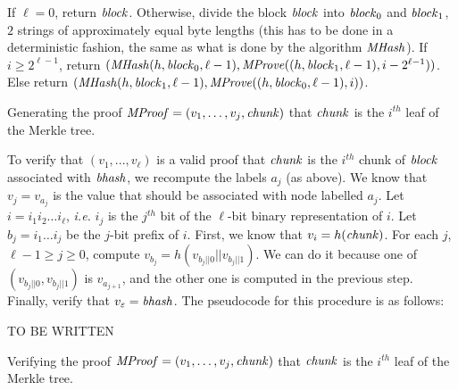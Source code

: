 \begin{algorithm}[H]\label{alg:merkleproof}
\dontprintsemicolon

\BlankLine


\Indp
  If $\ell=0$, return ${{\mathit{block}}}$. \;
  Otherwise, divide the block ${{\mathit{block}}}$ into ${{\mathit{block}}}_0$ and ${{\mathit{block}}}_1$, $2$ strings of approximately equal byte lengths (this has to be done in a deterministic fashion, the same as what is done by the algorithm ${{\mathit{MHash}}}$). \;
  If $i\geq 2^{\ell-1}$, return $({{\mathit{MHash}}}(h,{{\mathit{block}}}_0,\ell-1),{{\mathit{MProve}}}((h,{{\mathit{block}}}_1,\ell-1),i-2^{\ell-1}))$.\;
  Else return $({{\mathit{MHash}}}(h,{{\mathit{block}}}_1,\ell-1),{{\mathit{MProve}}}((h,{{\mathit{block}}}_0,\ell-1),i))$.\;
\Indm

\caption{Generating the proof ${{\mathit{MProof}}}=(v_1,\ldots,v_j,{{\mathit{chunk}}})$ that ${{\mathit{chunk}}}$ is the $i^\mathit{th}$ leaf of the Merkle tree.}
\end{algorithm}

To verify that $(v_1,...,v_\ell)$ is a valid proof that ${{\mathit{chunk}}}$ is the $i^\mathit{th}$ chunk of ${{\mathit{block}}}$
associated with ${{\mathit{bhash}}}$, 
we recompute the labels $a_j$ (as above).  We know that $v_j = v_{a_j}$ is the value that should be associated with node labelled
$a_j$.  Let $i=i_1i_2\ldots i_\ell$, \emph{i.e.} $i_j$ is the $j^\mathit{th}$
bit of the $\ell$-bit binary representation of $i$.
Let $b_j = i_1\ldots i_j$ be the $j$-bit prefix of $i$.
First, we know that $v_i = h({{\mathit{chunk}}})$.
For each $j$, $\ell-1\geq j \geq 0$, compute $v_{b_j}=h(v_{b_j||0}||v_{b_j||1})$.
We can do it because one of $(v_{b_j||0},v_{b_j||1})$ is $v_{a_{j+1}}$,
and the other one is computed in the previous step.
Finally, verify that $v_\varepsilon = {{\mathit{bhash}}}$.  The pseudocode for this procedure is as follows:

\begin{algorithm}[H]\label{alg:merkleverify}
\dontprintsemicolon

\BlankLine

TO BE WRITTEN

\caption{Verifying the proof ${{\mathit{MProof}}}=(v_1,\ldots,v_j,{{\mathit{chunk}}})$ that ${{\mathit{chunk}}}$ is the $i^\mathit{th}$ leaf of the Merkle tree.}
\end{algorithm}


